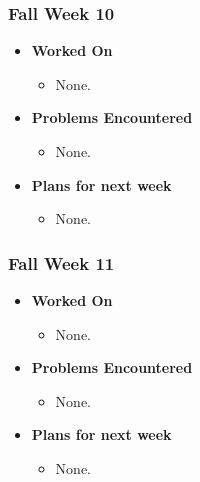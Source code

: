 \documentclass[compsoc,draftclsnofoot,onecolumn,10pt]{IEEEtran}
\begin{document}
\subsubsection{Fall Week 10}
\begin{itemize}
    \item {\textbf{Worked On}}
    \begin{itemize}
      \item None.
    \end{itemize}

    \item {\textbf{Problems Encountered}}
    \begin{itemize}
      \item None.
    \end{itemize}

    \item{\textbf{Plans for next week}}
    \begin{itemize}
      \item None.
    \end{itemize}

\end{itemize}

\subsubsection{Fall Week 11}
\begin{itemize}
    \item {\textbf{Worked On}}
    \begin{itemize}
      \item None.
    \end{itemize}

    \item {\textbf{Problems Encountered}}
    \begin{itemize}
      \item None.
    \end{itemize}

    \item{\textbf{Plans for next week}}
    \begin{itemize}
      \item None.
    \end{itemize}

\end{itemize}
\end{document}
